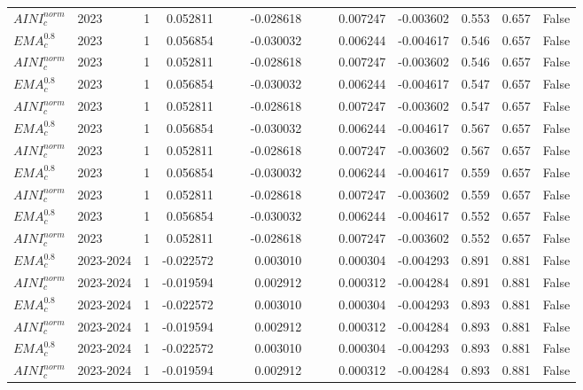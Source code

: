 \begin{tabular}{@{}llrrrrrrrrrlll@{}}
$AINI^{norm}_{c}$ & 2023 & 1 & 0.052811 &  &  & -0.028618 &  &  & 0.007247 & -0.003602 & 0.553 & 0.657 & False \\
$EMA^{0.8}_{c}$ & 2023 & 1 & 0.056854 &  &  & -0.030032 &  &  & 0.006244 & -0.004617 & 0.546 & 0.657 & False \\
$AINI^{norm}_{c}$ & 2023 & 1 & 0.052811 &  &  & -0.028618 &  &  & 0.007247 & -0.003602 & 0.546 & 0.657 & False \\
$EMA^{0.8}_{c}$ & 2023 & 1 & 0.056854 &  &  & -0.030032 &  &  & 0.006244 & -0.004617 & 0.547 & 0.657 & False \\
$AINI^{norm}_{c}$ & 2023 & 1 & 0.052811 &  &  & -0.028618 &  &  & 0.007247 & -0.003602 & 0.547 & 0.657 & False \\
$EMA^{0.8}_{c}$ & 2023 & 1 & 0.056854 &  &  & -0.030032 &  &  & 0.006244 & -0.004617 & 0.567 & 0.657 & False \\
$AINI^{norm}_{c}$ & 2023 & 1 & 0.052811 &  &  & -0.028618 &  &  & 0.007247 & -0.003602 & 0.567 & 0.657 & False \\
$EMA^{0.8}_{c}$ & 2023 & 1 & 0.056854 &  &  & -0.030032 &  &  & 0.006244 & -0.004617 & 0.559 & 0.657 & False \\
$AINI^{norm}_{c}$ & 2023 & 1 & 0.052811 &  &  & -0.028618 &  &  & 0.007247 & -0.003602 & 0.559 & 0.657 & False \\
$EMA^{0.8}_{c}$ & 2023 & 1 & 0.056854 &  &  & -0.030032 &  &  & 0.006244 & -0.004617 & 0.552 & 0.657 & False \\
$AINI^{norm}_{c}$ & 2023 & 1 & 0.052811 &  &  & -0.028618 &  &  & 0.007247 & -0.003602 & 0.552 & 0.657 & False \\
$EMA^{0.8}_{c}$ & 2023-2024 & 1 & -0.022572 &  &  & 0.003010 &  &  & 0.000304 & -0.004293 & 0.891 & 0.881 & False \\
$AINI^{norm}_{c}$ & 2023-2024 & 1 & -0.019594 &  &  & 0.002912 &  &  & 0.000312 & -0.004284 & 0.891 & 0.881 & False \\
$EMA^{0.8}_{c}$ & 2023-2024 & 1 & -0.022572 &  &  & 0.003010 &  &  & 0.000304 & -0.004293 & 0.893 & 0.881 & False \\
$AINI^{norm}_{c}$ & 2023-2024 & 1 & -0.019594 &  &  & 0.002912 &  &  & 0.000312 & -0.004284 & 0.893 & 0.881 & False \\
$EMA^{0.8}_{c}$ & 2023-2024 & 1 & -0.022572 &  &  & 0.003010 &  &  & 0.000304 & -0.004293 & 0.893 & 0.881 & False \\
$AINI^{norm}_{c}$ & 2023-2024 & 1 & -0.019594 &  &  & 0.002912 &  &  & 0.000312 & -0.004284 & 0.893 & 0.881 & False \\

\end{tabular}
